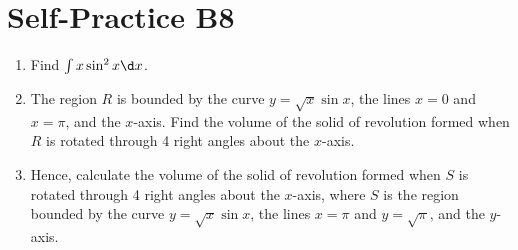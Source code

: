 \section{Self-Practice B8}

\begin{problem}
    \begin{enumerate}
        \item Find $\int x\sin^2 x \d x$.
        \item The region $R$ is bounded by the curve $y=\sqrt{x}\sin x$, the lines $x=0$ and $x=\pi$, and the $x$-axis. Find the volume of the solid of revolution formed when $R$ is rotated through 4 right angles about the $x$-axis.
        \item Hence, calculate the volume of the solid of revolution formed when $S$ is rotated through 4 right angles about the $x$-axis, where $S$ is the region bounded by the curve $y=\sqrt{x}\sin x$, the lines $x=\pi$ and $y=\sqrt{\pi}$, and the $y$-axis.
    \end{enumerate}
\end{problem}

